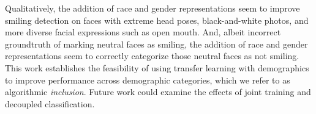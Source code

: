 \documentclass{article}
\begin{document}
Qualitatively, the addition of race and gender representations seem to improve smiling detection on faces with extreme head poses, black-and-white photos, and more diverse facial expressions such as open mouth.  And, albeit incorrect groundtruth of marking neutral faces as smiling, the addition of race and gender representations seem to correctly categorize those neutral faces as not smiling.  This work establishes the feasibility of using transfer learning with demographics to improve performance across demographic categories, which we refer to as algorithmic {\it inclusion}. Future work could examine the effects of joint training and decoupled classification.\vspace{-1em}


\begin{table}[t]
\begin{center}
\end{center}
\caption{{\bf McNemar Test.} (*) indicates P-value from an exact binomial test and ${\chi}^2$ from McNemar's test with continuity correction.\vspace{-1.5em}}\label{tab:mcnemar}
\end{table}

\end{document}
